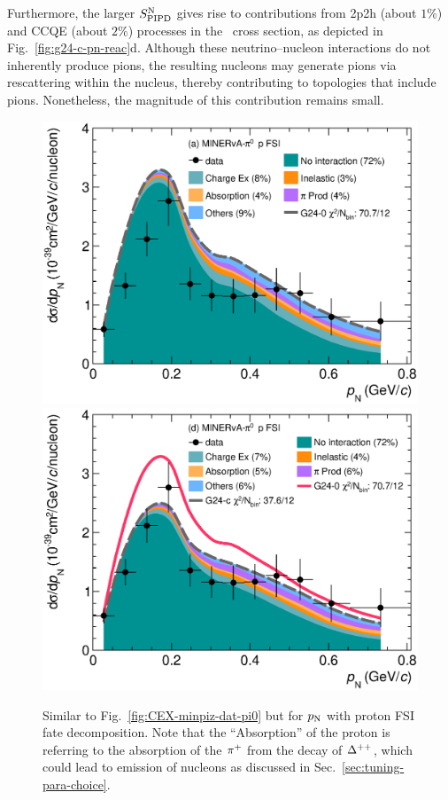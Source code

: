     Furthermore, the larger $S_\textrm{PIPD}^\textrm{N}$ gives rise to contributions from 2p2h (about $1\%$) and CCQE (about $2\%$) processes in the \minpiz\ cross section, as depicted in Fig.~\ref{fig:g24-c-pn-reac}d. 
    Although these neutrino–nucleon interactions do not inherently produce pions, the resulting nucleons may generate pions via rescattering within the nucleus, thereby contributing to topologies that include pions. 
    Nonetheless, the magnitude of this contribution remains small.

    \begin{figure}[!htb] 	
        \centering 		
        \includegraphics[width=\dbfigwid\textwidth]{figures/tuning/0000-min_pi0_pn_pr_decomp_cex.eps}
        \includegraphics[width=\dbfigwid\textwidth]{figures/tuning/0026-min_pi0_pn_pr_decomp_covfix.eps}	
        \caption{\label{fig:minpiz-pn-pr} Similar to Fig.~\ref{fig:CEX-minpiz-dat-pi0} but for $p_\textrm{N}$ with proton FSI fate decomposition. Note that the ``Absorption'' of the proton is referring to the absorption of the $\pi^+$ from the decay of $\Delta^{++}$, which could lead to emission of nucleons as discussed in Sec.~\ref{sec:tuning-para-choice}.     
        } 
    \end{figure}


